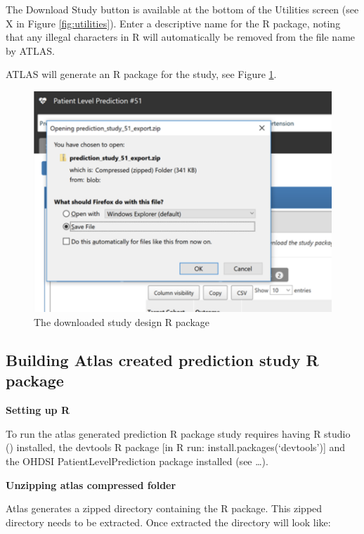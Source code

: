 \documentclass[11pt]{book}
\theoremstyle{definition}
\theoremstyle{definition}
\theoremstyle{definition}
\theoremstyle{remark}
\begin{document}
The Download Study button is available at the bottom of the Utilities screen (see X in Figure \ref{fig:utilities}). Enter a descriptive name for the R package, noting that any illegal characters in R will automatically be removed from the file name by ATLAS.

ATLAS will generate an R package for the study, see Figure \ref{fig:figureU9}.

\begin{figure}
\includegraphics[width=1\linewidth]{images/PatientLevelPrediction/atlasImplementation/utilities_downloading} \caption{The downloaded study design R package}\label{fig:figureU9}
\end{figure}

\hypertarget{building-atlas-created-prediction-study-r-package}{%
\subsection{Building Atlas created prediction study R package}\label{building-atlas-created-prediction-study-r-package}}

\textbf{Setting up R}

To run the atlas generated prediction R package study requires having R studio () installed, the devtools R package {[}in R run: install.packages(`devtools'){]} and the OHDSI PatientLevelPrediction package installed (see \ldots).

\textbf{Unzipping atlas compressed folder}

Atlas generates a zipped directory containing the R package. This zipped directory needs to be extracted. Once extracted the directory will look like:
\end{document}
